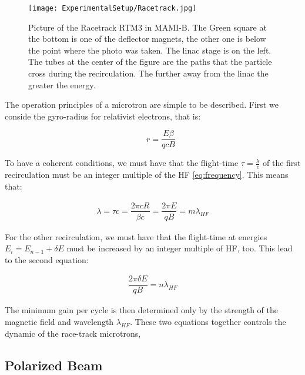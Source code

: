 \begin{figure}[hbtp]
\centering
\texttt{[image: ExperimentalSetup/Racetrack.jpg]}
\caption{Picture of the Racetrack RTM3 in MAMI-B. The Green square at the bottom is one of the deflector magnets, the other one is below the point where the photo was taken. The linac stage is on the left. The tubes at the center of the figure are the paths that the particle cross during the recirculation. The further away from the linac the greater the energy.}
\end{figure}

The operation principles of a microtron are simple to be described. First we conside the gyro-radius for relativist electrons, that is:

\begin{equation}
\qquad r = \dfrac{E \beta}{qcB}
\end{equation}

To have a coherent conditions, we must have that the flight-time $\tau = \frac{\lambda}{c}$ of the first recirculation must be an integer multiple of the HF \ref{eq:frequency}. This means that:

\begin{align*}
\lambda = \tau c =\dfrac{ 2 \pi c R }{\beta c} = \dfrac{2 \pi E}{q B} = m \lambda_{HF}
\end{align*}

For the other recirculation, we must have that the flight-time at energies $E_{i} = E_{n-1} + \delta E$ must be increased by an integer multiple of HF, too. This lead to the second equation:

\begin{align*}
\dfrac{2 \pi \delta E}{q B} = n \lambda_{HF}
\end{align*}

The minimum gain per cycle is then determined only by the strength of the magnetic field and wavelength $\lambda_{HF}$. These two equations together controls the dynamic of the race-track microtrons,

\subsection{Polarized Beam}
 \medskip

